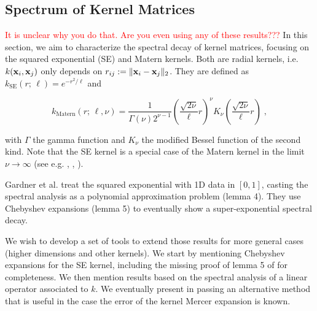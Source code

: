 \documentclass{article}
\begin{document}
{\begin{observation}
\end{observation}

\subsection{Spectrum of Kernel Matrices}

\textcolor{red}{It is unclear why you do that. Are you even using any of these results???} In this section, we aim to characterize the spectral decay of kernel matrices, focusing on the squared exponential (SE) and Matern kernels. 
Both are radial kernels, i.e. $k(\boldsymbol{\mathbf{x}}_i, \boldsymbol{\mathbf{x}}_j)$ only depends on $r_{ij} := \Vert \boldsymbol{\mathbf{x}}_i -  \boldsymbol{\mathbf{x}}_j \Vert_2$. They are defined as $k_\text{SE}(r; \, \ell) = e^{-r^2 / \ell}$ and

\begin{equation*}
    k_{\text{Matern}}(r ; \, \ell, \nu) = \frac{1}{\Gamma(\nu) 2^{\nu - 1}} \left( \frac{\sqrt{2\nu}}{\ell} r \right)^\nu K_\nu \left( \frac{\sqrt{2\nu}}{\ell} r \right) \; ,
\end{equation*}

with $\Gamma$ the gamma function and $K_\nu$ the modified Bessel function of the second kind. Note that the SE kernel is a special case of the Matern kernel in the limit $\nu\to\infty$ (see e.g. \cite{borovitskiy_matern_nodate}, \cite{genton_classes_2002}, \cite{rasmussen_gaussian_2005}).

Gardner et al. \cite{gardner_gpytorch_2021} treat the squared exponential with 1D data in $[0, 1]$, casting the spectral analysis as a polynomial approximation problem (lemma 4). They use Chebyshev expansions (lemma 5) to eventually show a super-exponential spectral decay. 

We wish to develop a set of tools to extend those results for more general cases (higher dimensions and other kernels). 
We start by mentioning Chebyshev expansions for the SE kernel, including the missing proof of lemma 5 of \cite{gardner_gpytorch_2021} for completeness.  
We then mention results based on the spectral analysis of a linear operator associated to $k$. We eventually present in passing an alternative method that is useful in the case the error of the kernel Mercer expansion is known. 


}
\end{document}
